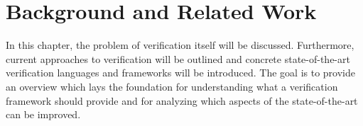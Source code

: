 \chapter{Background and Related Work} %
\label{ch:background}

In this chapter, the problem of verification itself will be discussed. Furthermore, current approaches to
verification will be outlined and concrete state-of-the-art verification languages and frameworks will be introduced.
The goal is to provide an overview which lays the foundation for understanding what a verification framework should
provide and for analyzing which aspects of the state-of-the-art can be improved.

